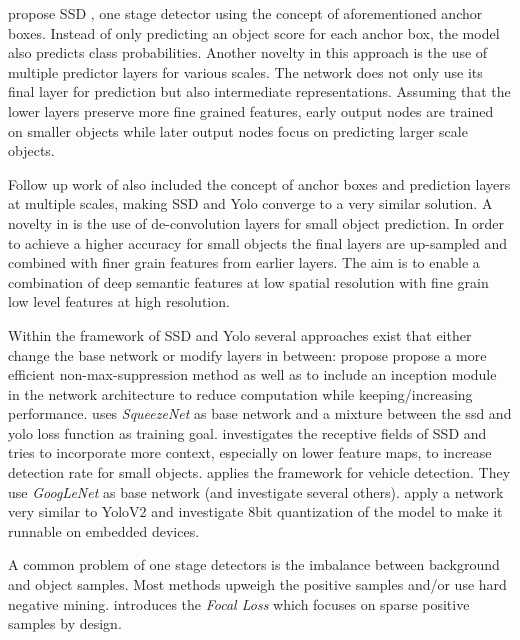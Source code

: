 \citeauthor{Liu} propose \ac{SSD} \cite{Liu}, one stage detector using the concept of aforementioned anchor boxes. Instead of only predicting an object score for each anchor box, the model also predicts class probabilities. Another novelty in this approach is the use of multiple predictor layers for various scales. The network does not only use its final layer for prediction but also intermediate representations. Assuming that the lower layers preserve more fine grained features, early output nodes are trained on smaller objects while later output nodes focus on predicting larger scale objects.

Follow up work of \citeauthor{Redmon}\cite{Redmon, Redmona} also included the concept of anchor boxes and prediction layers at multiple scales, making \ac{SSD} and \ac{Yolo} converge to a very similar solution. A novelty in \cite{Redmona} is the use of de-convolution layers for small object prediction. In order to achieve a higher accuracy for small objects the final layers are up-sampled and combined with finer grain features from earlier layers. The aim is to enable a combination of deep semantic features at low spatial resolution with fine grain low level features at high resolution.

Within the framework of \ac{SSD} and \ac{Yolo} several approaches exist that either change the base network or modify layers in between: \cite{ChengchengNing2017} propose propose a more efficient non-max-suppression method as well as to include an inception module in the network architecture to reduce computation while keeping/increasing performance. \cite{Wu} uses \textit{SqueezeNet} as base network and a mixture between the ssd and yolo loss function as training goal. \cite{Xiang} investigates the receptive fields of SSD and tries to incorporate more context, especially on lower feature maps, to increase detection rate for small objects.\cite{Linb} applies the framework for vehicle detection. They use \textit{GoogLeNet} as base network (and investigate several others).\cite{TripathiSanDiego} apply a network very similar to YoloV2 and investigate 8bit quantization of the model to make it runnable on embedded devices.

A common problem of one stage detectors is the imbalance between background and object samples. Most methods upweigh the positive samples and/or use hard negative mining. \cite{Lin} introduces the \textit{Focal Loss} which focuses on sparse positive samples by design.



